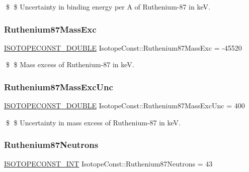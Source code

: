 \$ \$ Uncertainty in binding energy per A of Ruthenium-\/87 in keV. \mbox{\label{group___isotope_const-_ruthenium-_ru87_ga05d06d116b8eed3fcca034258c104a70}} 
\subsubsection{\texorpdfstring{Ruthenium87\+Mass\+Exc}{Ruthenium87MassExc}}
{\footnotesize\ttfamily \mbox{\hyperlink{group___isotope_const-_macros_ga8f45a7272ce02c0b4c65c44636ed719a}{I\+S\+O\+T\+O\+P\+E\+C\+O\+N\+S\+T\+\_\+\+D\+O\+U\+B\+LE}} Isotope\+Const\+::\+Ruthenium87\+Mass\+Exc = -\/45520}

\$ \$ Mass excess of Ruthenium-\/87 in keV. \mbox{\label{group___isotope_const-_ruthenium-_ru87_gafdba6e7b9deb46c092a76e0fddfdf7cd}} 
\subsubsection{\texorpdfstring{Ruthenium87\+Mass\+Exc\+Unc}{Ruthenium87MassExcUnc}}
{\footnotesize\ttfamily \mbox{\hyperlink{group___isotope_const-_macros_ga8f45a7272ce02c0b4c65c44636ed719a}{I\+S\+O\+T\+O\+P\+E\+C\+O\+N\+S\+T\+\_\+\+D\+O\+U\+B\+LE}} Isotope\+Const\+::\+Ruthenium87\+Mass\+Exc\+Unc = 400}

\$ \$ Uncertainty in mass excess of Ruthenium-\/87 in keV. \mbox{\label{group___isotope_const-_ruthenium-_ru87_gaf2d2519843df393d99ad752be4768a2d}} 
\subsubsection{\texorpdfstring{Ruthenium87\+Neutrons}{Ruthenium87Neutrons}}
{\footnotesize\ttfamily \mbox{\hyperlink{group___isotope_const-_macros_ga5f18360b3e99483a35c32d789e62621c}{I\+S\+O\+T\+O\+P\+E\+C\+O\+N\+S\+T\+\_\+\+I\+NT}} Isotope\+Const\+::\+Ruthenium87\+Neutrons = 43}

